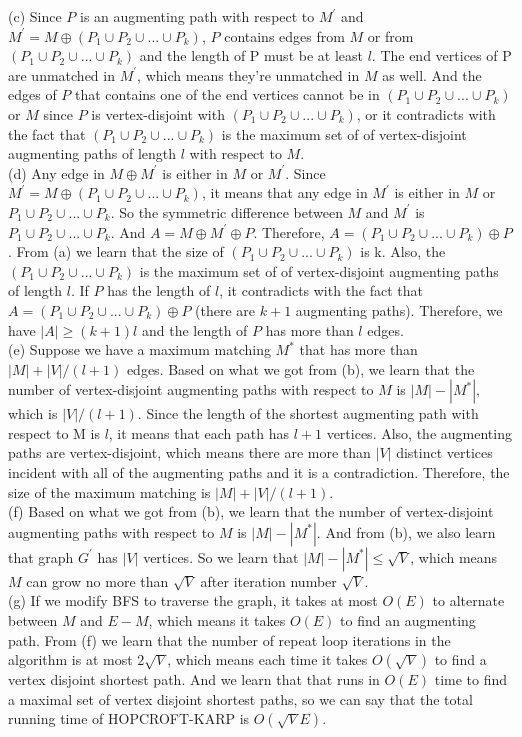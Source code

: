 \documentclass{article}
\begin{document}
(c) Since $P$ is an augmenting path with respect to $M^{'}$ and $M^{'} = M\oplus (P_1\cup P_2\cup ... \cup P_k)$, $P$ contains edges from $M$ or from $(P_1\cup P_2\cup ... \cup P_k)$ and the length of P must be at least $l$. The end vertices of P are unmatched in $M^{'}$, which means they're unmatched in $M$ as well. And the edges of $P$ that contains one of the end vertices cannot be in $(P_1\cup P_2\cup ... \cup P_k)$ or $M$ since $P$ is vertex-disjoint with $(P_1\cup P_2\cup ... \cup P_k)$, or it contradicts with the fact that $(P_1\cup P_2\cup ... \cup P_k)$ is the maximum set of of vertex-disjoint augmenting paths of length $l$ with respect to $M$.\\ \newline
(d) Any edge in $M\oplus M^{'}$ is either in $M$ or $M^{'}$. Since $M^{'} = M\oplus (P_1\cup P_2\cup ... \cup P_k)$, it means that any edge in $M^{'}$ is either in $M$ or $P_1\cup P_2\cup ... \cup P_k$. So the symmetric difference between $M$ and $M^{'}$ is $P_1\cup P_2\cup ... \cup P_k$. And $A = M\oplus M^{'}\oplus P$. Therefore, $A = (P_1\cup P_2\cup ... \cup P_k)\oplus P$. From (a) we learn that the size of $(P_1\cup P_2\cup ... \cup P_k)$ is k. Also, the $(P_1\cup P_2\cup ... \cup P_k)$ is the maximum set of of vertex-disjoint augmenting paths of length $l$. If $P$ has the length of $l$, it contradicts with the fact that $A = (P_1\cup P_2\cup ... \cup P_k)\oplus P$ (there are $k+1$ augmenting paths). Therefore, we have $|A| \geq (k + 1)l$ and the length of $P$ has more than $l$ edges. \\\newline
(e) Suppose we have a maximum matching $M^{*}$ that has more than $|M| + |V|/(l + 1)$ edges. Based on what we got from (b), we learn that the number of vertex-disjoint augmenting paths with respect to $M$ is $|M| - |M^{*}|$, which is $|V|/(l + 1)$. Since the length of the shortest augmenting path with respect to M is $l$, it means that each path has $l + 1$ vertices. Also, the augmenting paths are vertex-disjoint, which means there are more than $|V|$ distinct vertices incident with all of the augmenting paths and it is a contradiction. Therefore, the size of the maximum matching is $|M| + |V|/(l + 1)$.\\ \newline
(f) Based on what we got from (b), we learn that the number of vertex-disjoint augmenting paths with respect to $M$ is $|M| - |M^{*}|$. And from (b), we also learn that graph $G^{'}$ has $|V|$ vertices. So we learn that $|M| - |M^{*}| \leq \sqrt{V}$, which means $M$ can grow no more than $\sqrt{V}$ after iteration number $\sqrt{V}$.\\ \newline
(g) If we modify BFS to traverse the graph, it takes at most $O(E)$ to alternate between $M$ and $E - M$, which means it takes $O(E)$ to find an augmenting path. From (f) we learn that the number of repeat loop iterations in the algorithm is at most $2\sqrt{V}$, which means each time it takes $O(\sqrt{V})$ to find a vertex disjoint shortest path. And we learn that that runs in $O(E)$ time to find a maximal set of vertex disjoint shortest paths, so we can say that the total running time of HOPCROFT-KARP is $O(\sqrt{V}E)$. \\
\end{document}
